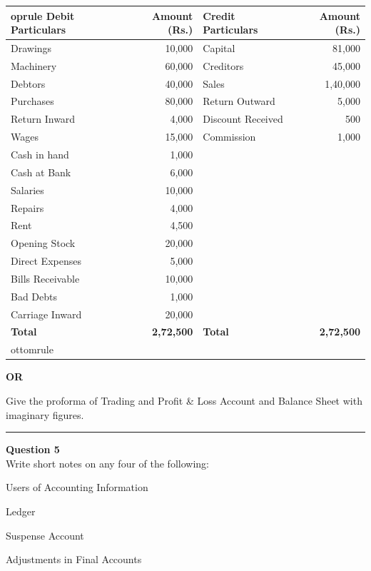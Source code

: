 \documentclass[11pt,a4paper]{article}
\begin{document}
\begin{center}
\small

\begin{tabular}{l r l r}
 oprule
   \textbf{Debit Particulars} &   \textbf{Amount (Rs.)} &   \textbf{Credit Particulars} &   \textbf{Amount (Rs.)} \\
\midrule
Drawings & 10,000 & Capital & 81,000 \\
Machinery & 60,000 & Creditors & 45,000 \\
Debtors & 40,000 & Sales & 1,40,000 \\
Purchases & 80,000 & Return Outward & 5,000 \\
Return Inward & 4,000 & Discount Received & 500 \\
Wages & 15,000 & Commission & 1,000 \\
Cash in hand & 1,000 & & \\
Cash at Bank & 6,000 & & \\
Salaries & 10,000 & & \\
Repairs & 4,000 & & \\
Rent & 4,500 & & \\
Opening Stock & 20,000 & & \\
Direct Expenses & 5,000 & & \\
Bills Receivable & 10,000 & & \\
Bad Debts & 1,000 & & \\
Carriage Inward & 20,000 & & \\
\midrule
   \textbf{Total} &   \textbf{2,72,500} &   \textbf{Total} &   \textbf{2,72,500} \\
ottomrule
\end{tabular}
\end{center}


\begin{center}   \textbf{OR}\end{center}

Give the proforma of Trading and Profit \& Loss Account and Balance Sheet with imaginary figures.

\medskip\rule{\linewidth}{0.2pt}\medskip




\noindent   \textbf{Question 5} \\
Write short notes on any four of the following:

\begin{parts}
  \item Users of Accounting Information
  \item Ledger
  \item Suspense Account
  \item Adjustments in Final Accounts
\end{parts}
\end{document}
